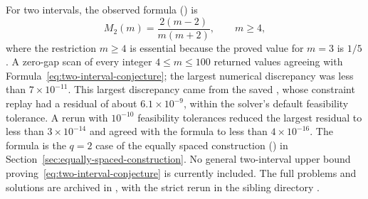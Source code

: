 For two intervals, the observed formula
() is
\begin{equation}
    M_2(m)=\frac{2(m-2)}{m(m+2)},\qquad m\geq4,
    \label{eq:two-interval-conjecture}
\end{equation}
where the restriction \(m\geq4\) is essential because the proved value for
\(m=3\) is \(1/5\).  A zero-gap scan of every integer
\(4\leq m\leq100\) returned values agreeing with
Formula~\eqref{eq:two-interval-conjecture}; the largest numerical discrepancy
was less than \(7\times10^{-11}\).  This largest discrepancy came from the
saved , whose constraint replay had a residual of about
\(6.1\times10^{-9}\), within the solver's default feasibility tolerance.  A
rerun with \(10^{-10}\) feasibility tolerances reduced the largest residual to
less than \(3\times10^{-14}\) and agreed with the formula to less than
\(4\times10^{-16}\).  The formula is the \(q=2\) case of the equally spaced
construction () in
Section~\ref{sec:equally-spaced-construction}.  No general
two-interval upper bound proving~\eqref{eq:two-interval-conjecture} is currently
included.  The full problems and solutions are archived in
, with the strict
rerun in the sibling directory .
